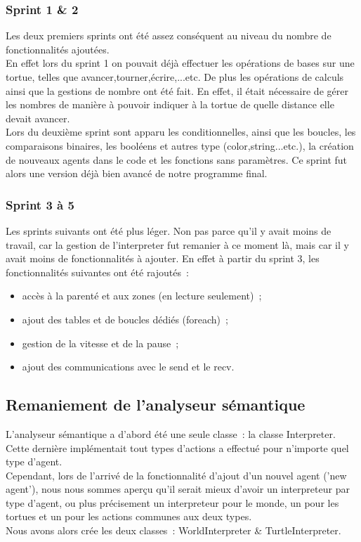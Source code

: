 \subsubsection{Sprint 1 \& 2}
Les deux premiers sprints ont été assez conséquent au niveau du nombre de fonctionnalités ajoutées.\\
En effet lors du sprint 1 on pouvait déjà effectuer les opérations de bases sur une tortue, telles que avancer,tourner,écrire,...etc. De plus les opérations de calculs ainsi que la gestions de nombre ont été fait. En effet, il était nécessaire de gérer les nombres de manière à pouvoir indiquer à la tortue de quelle distance elle devait avancer.\\

Lors du deuxième sprint sont apparu les conditionnelles, ainsi que les boucles, les comparaisons binaires, les booléens et autres type (color,string...etc.), la création de nouveaux agents dans le code et les fonctions sans paramètres. Ce sprint fut alors une version déjà bien avancé de notre programme final.


\subsubsection{Sprint 3 à 5}
Les sprints suivants ont été plus léger. Non pas parce qu'il y avait moins de travail, car la gestion de l'interpreter fut remanier à ce moment là, mais car il y avait moins de fonctionnalités à ajouter. En effet à partir du sprint 3, les fonctionnalités suivantes ont été rajoutés~:
\begin{itemize}
\item accès à la parenté et aux zones (en lecture seulement)~;
\item ajout des tables et de boucles dédiés (foreach)~;
\item gestion de la vitesse et de la pause~;
\item ajout des communications avec le send et le recv.
\end{itemize}


\subsection{Remaniement de l'analyseur sémantique}
\label{remaniementInterpreter}

L'analyseur sémantique a d'abord été une seule classe~: la classe Interpreter.\\
Cette dernière implémentait tout types d'actions a effectué pour n'importe quel type d'agent.\\
Cependant, lors de l'arrivé de la fonctionnalité d'ajout d'un nouvel agent ('new agent'), nous nous sommes aperçu qu'il serait mieux d'avoir un interpreteur par type d'agent, ou plus précisement un interpreteur pour le monde, un pour les tortues et un pour les actions communes aux deux types.\\
Nous avons alors crée les deux classes~: WorldInterpreter \& TurtleInterpreter.\\

